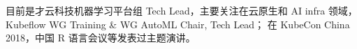 

\begin{cvparagraph}
\begin{minipage}[t]{\textwidth}
目前是才云科技机器学习平台组 Tech Lead，主要关注在云原生和 AI infra 领域，Kubeflow WG Training \& WG AutoML Chair, Tech Lead；
在 KubeCon China 2018，中国 R 语言会议等发表过主题演讲。
\end{minipage}
\end{cvparagraph}

